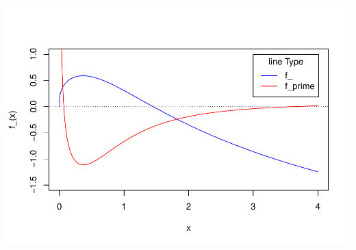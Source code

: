 \documentclass[
]{article}
\begin{document}
\includegraphics{Homework_05_Pan-Lei_files/figure-latex/unnamed-chunk-2-1.pdf}
\end{document}
